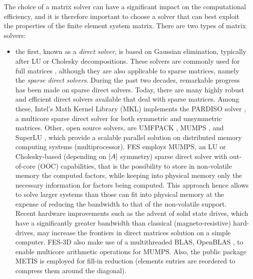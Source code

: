 The choice of a matrix solver can have a significant impact on the computational efficiency, and it is therefore important to choose a solver that can best exploit the properties of the finite element system matrix. There are two types of matrix solvers:
%
\begin{itemize}
\item the first, known as a \textit{direct solver}, is based on Gaussian elimination, typically after LU or Cholesky decompositions. These solvers are commonly used for full matrices \cite{anderson1995lapack}, although they are also applicable to sparse matrices, namely the \textit{sparse direct solvers}. During the past two decades, remarkable progress has been made on sparse direct solvers. Today, there are many highly robust and efficient direct solvers available that deal with sparse matrices. Among these, Intel's Math Kernel Library (MKL) \cite{intel2013MKL} implements the PARDISO solver \cite{schenk2001pardiso}, a multicore sparse direct solver for both symmetric and unsymmetric matrices. Other, open source solvers, are UMFPACK \cite{davis2004algorithm}, MUMPS \cite{amestoy2001mumps}, and SuperLU \cite{li2011superlu}, which provide a scalable parallel solution on distributed memory computing systems (multiprocessor). FES employs MUMPS, an LU or Cholesky-based (depending on $\left[A\right]$ symmetry) sparse direct solver with out-of-core (OOC) capabilities, that is the possibility to store in non-volatile memory the computed factors, while keeping into physical memory only the necessary information for factors being computed. This approach hence allows to solve larger systems than those can fit into physical memory at the expense of reducing the bandwidth to that of the non-volatile support. Recent hardware improvements such as the advent of solid state drives, which have a significantly greater bandwidth than classical (magneto-resistive) hard-drives, may increase the frontiers in direct matrices solution on a simple computer. FES-3D also make use of a multithreaded BLAS, OpenBLAS \cite{OpenBlas}, to enable multicore arithmetic operations for MUMPS. Also, the public package METIS \cite{karypis1995metis} is employed for fill-in reduction (elements entries are reordered to compress them around the diagonal).
%

\end{itemize}
